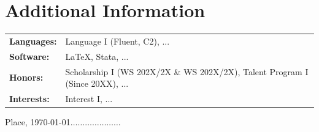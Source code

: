 \documentclass[10pt,letterpaper]{article}																			%
\begin{document}

\section{Additional Information}
\hspace{-0.2cm}\begin{tabularx}{18.4cm}{lX}																	%

\textbf{Languages:}
& Language I (Fluent, C2),  ...\\

\textbf{Software:}
& \LaTeX, Stata,  ... \\

\textbf{Honors:}
& Scholarship I (WS 202X/2X \& WS 202X/2X),  Talent Program I (Since 20XX),  ...\\

\textbf{Interests:}
& Interest I,  ...

\end{tabularx}


\vfill
\noindent
\hfill {\footnotesize Place,  \today $\ldots\ldots\ldots\ldots\ldots\ldots\ldots$}						 %
\end{document}
